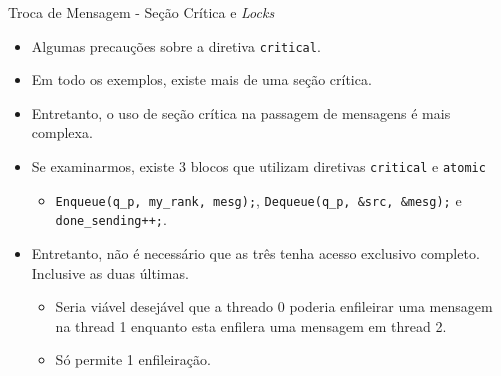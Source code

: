 	\begin{frame}{Troca de Mensagem -  Seção Crítica e \textit{Locks}}
		\begin{itemize}
			\item Algumas precauções sobre a diretiva {\tt critical}.
			\item Em todo os exemplos, existe mais de uma seção crítica.
			\item Entretanto, o uso de seção crítica na passagem de mensagens é mais complexa.
			\item Se examinarmos, existe 3 blocos que utilizam diretivas {\tt critical} e {\tt atomic}
			\begin{itemize}
				\item {\tt Enqueue(q\_p, my\_rank, mesg);}, {\tt Dequeue(q\_p, \&src, \&mesg);} e {\tt done\_sending++;}.
			\end{itemize}
			\item Entretanto, não é necessário que as três tenha acesso exclusivo completo. Inclusive as duas últimas.
			\begin{itemize}
				\item Seria viável desejável que a threado 0 poderia enfileirar uma mensagem na thread 1 enquanto esta enfilera uma mensagem em thread 2.
				\item Só permite 1 enfileiração.
			\end{itemize}
		\end{itemize}
	\end{frame}

